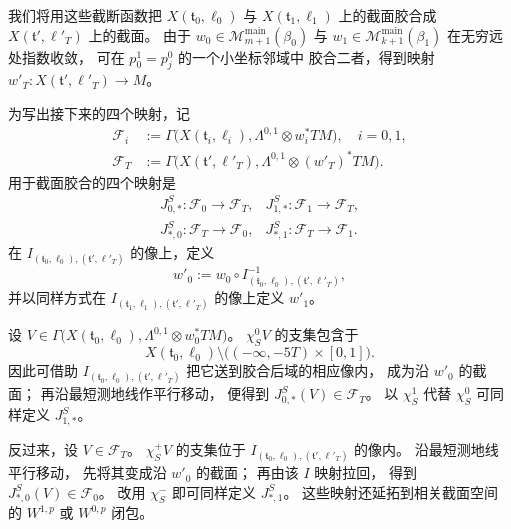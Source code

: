 我们将用这些截断函数把
$X(\mathfrak t_0,\ell_0)$ 与
$X(\mathfrak t_1,\ell_1)$ 上的截面胶合成
$X(\mathfrak t',\ell'_T)$ 上的截面。
由于
$w_0\in\mathcal M^{\mathrm{main}}_{m+1}(\beta_0)$
与
$w_1\in\mathcal M^{\mathrm{main}}_{k+1}(\beta_1)$
在无穷远处指数收敛，
可在 $p_0^1=p_j^0$ 的一个小坐标邻域中
胶合二者，得到映射
$w'_T\colon X(\mathfrak t',\ell'_T)\to M$。

为写出接下来的四个映射，记
\[
\begin{aligned}
\mathcal F_i&:=\Gamma\bigl(X(\mathfrak t_i,\ell_i),
 \Lambda^{0,1}\otimes w_i^*TM\bigr),\quad i=0,1,\\
\mathcal F_T&:=\Gamma\bigl(X(\mathfrak t',\ell'_T),
 \Lambda^{0,1}\otimes (w'_T)^*TM\bigr).
\end{aligned}
\]
用于截面胶合的四个映射是
\[
\begin{array}{ll}
J_{0,*}^{S}\colon\mathcal F_0\longrightarrow\mathcal F_T,
&J_{1,*}^{S}\colon\mathcal F_1\longrightarrow\mathcal F_T,\\[2pt]
J_{*,0}^{S}\colon\mathcal F_T\longrightarrow\mathcal F_0,
&J_{*,1}^{S}\colon\mathcal F_T\longrightarrow\mathcal F_1.
\end{array}
\]
在 $I_{(\mathfrak t_0,\ell_0),(\mathfrak t',\ell'_T)}$
的像上，定义
\[
w'_0:=w_0\circ
I_{(\mathfrak t_0,\ell_0),(\mathfrak t',\ell'_T)}^{-1},
\]
并以同样方式在
$I_{(\mathfrak t_1,\ell_1),(\mathfrak t',\ell'_T)}$
的像上定义 $w'_1$。

设
$V\in\Gamma\bigl(X(\mathfrak t_0,\ell_0),
\Lambda^{0,1}\otimes w_0^*TM\bigr)$。
$\chi_S^0V$ 的支集包含于
\[
X(\mathfrak t_0,\ell_0)
\setminus\bigl((-\infty,-5T)\times[0,1]\bigr).
\]
因此可借助
$I_{(\mathfrak t_0,\ell_0),(\mathfrak t',\ell'_T)}$
把它送到胶合后域的相应像内，
成为沿 $w'_0$ 的截面；
再沿最短测地线作平行移动，
便得到 $J_{0,*}^{S}(V)\in\mathcal F_T$。
以 $\chi_S^1$ 代替 $\chi_S^0$
可同样定义 $J_{1,*}^{S}$。

反过来，设 $V\in\mathcal F_T$。
$\chi_S^+V$ 的支集位于
$I_{(\mathfrak t_0,\ell_0),(\mathfrak t',\ell'_T)}$
的像内。
沿最短测地线平行移动，
先将其变成沿 $w'_0$ 的截面；
再由该 $I$ 映射拉回，
得到 $J_{*,0}^{S}(V)\in\mathcal F_0$。
改用 $\chi_S^-$ 即可同样定义
$J_{*,1}^{S}$。
这些映射还延拓到相关截面空间的
$W^{1,p}$ 或 $W^{0,p}$ 闭包。
